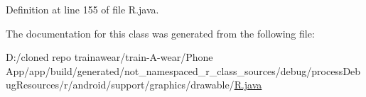 Definition at line 155 of file R.\+java.



The documentation for this class was generated from the following file\+:\begin{DoxyCompactItemize}
\item 
D\+:/cloned repo trainawear/train-\/\+A-\/wear/\+Phone App/app/build/generated/not\+\_\+namespaced\+\_\+r\+\_\+class\+\_\+sources/debug/process\+Debug\+Resources/r/android/support/graphics/drawable/\mbox{\hyperlink{process_debug_resources_2r_2android_2support_2graphics_2drawable_2_r_8java}{R.\+java}}\end{DoxyCompactItemize}
